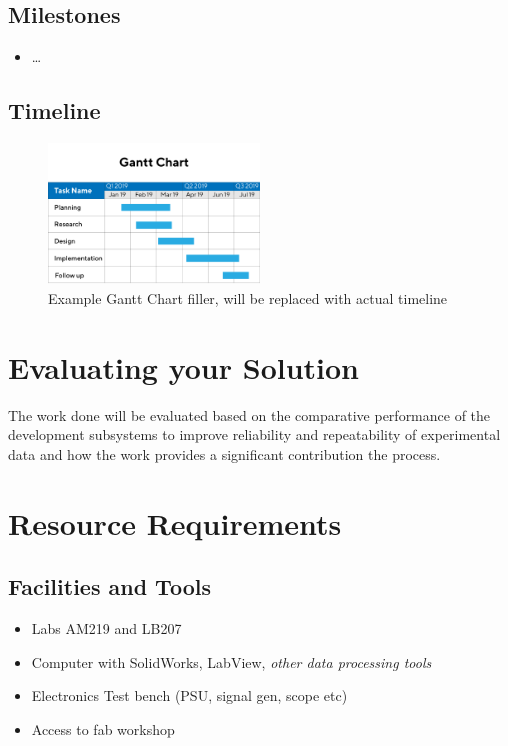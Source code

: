 \documentclass[11pt, a4paper, twoside, openright]{report}
\begin{document}
\subsection{Milestones}
\begin{itemize}
  \item \dots
\end{itemize}

\subsection{Timeline}
\begin{figure}[h]
  \centering
  \includegraphics[width=0.5\textwidth]{Figures/Gantt-chart_filler.png}
  \caption{Example Gantt Chart filler, will be replaced with actual timeline}
\end{figure}

\section{Evaluating your Solution}
The work done will be evaluated based on the comparative performance of the development subsystems to improve reliability and repeatability of experimental data and how the work provides a significant contribution the process. 

\section{Resource Requirements}


\subsection{Facilities and Tools}
\begin{itemize}
  \item Labs AM219 and LB207
  \item Computer with SolidWorks, LabView, \textit{other data processing tools}
  \item Electronics Test bench (PSU, signal gen, scope etc)
  \item Access to fab workshop
\end{itemize}
\end{document}
